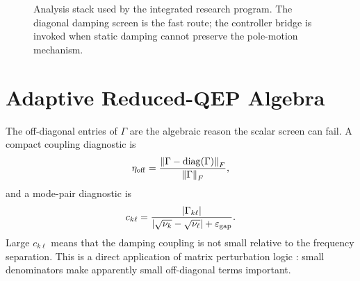 \begin{figure}[ht]
\centering
{}
\caption{Analysis stack used by the integrated research program. The diagonal
damping screen is the fast route; the controller bridge is invoked when static
damping cannot preserve the pole-motion mechanism.}
\label{fig:integrated_analysis_stack}
\end{figure}

\FloatBarrier

\section{Adaptive Reduced-QEP Algebra}

The off-diagonal entries of \(\Gamma\) are the algebraic reason the scalar
screen can fail. A compact coupling diagnostic is
\begin{equation}
  \eta_{\rm off}
  =
  \frac{\left\lVert \Gamma-\operatorname{diag}(\Gamma) \right\rVert_F}{\left\lVert \Gamma \right\rVert_F},
  \label{eq:eta_off}
\end{equation}
and a mode-pair diagnostic is
\begin{equation}
  c_{k\ell}
  =
  \frac{|\Gamma_{k\ell}|}
       {|\sqrt{\nu_k}-\sqrt{\nu_\ell}|+\varepsilon_{\rm gap}}.
  \label{eq:pair_coupling}
\end{equation}
Large \(c_{k\ell}\) means that the damping coupling is not small relative to
the frequency separation. This is a direct application of matrix perturbation
logic \cite{stewart1990matrix,kato1995perturbation}: small denominators make
apparently small off-diagonal terms important.

